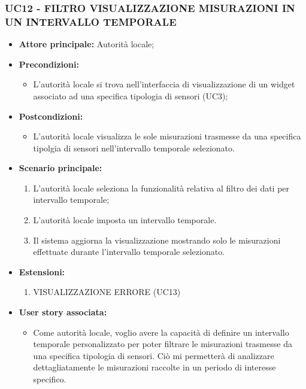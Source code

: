 \subsubsection{UC12 - FILTRO VISUALIZZAZIONE MISURAZIONI IN UN INTERVALLO TEMPORALE}
\begin{itemize}
    \item \textbf{Attore principale:} Autorità locale;
    \item \textbf{Precondizioni:}
        \begin{itemize}
            \item L'autorità locale si trova nell'interfaccia di visualizzazione di un widget associato ad una specifica tipologia di sensori (UC3); 
        \end{itemize}
    \item \textbf{Postcondizioni:}
        \begin{itemize}
            \item L'autorità locale visualizza le sole misurazioni trasmesse da una specifica tipolgia di sensori nell'intervallo temporale selezionato.
        \end{itemize}
    \item \textbf{Scenario principale:}
        \begin{enumerate}
            \item L'autorità locale seleziona la funzionalità relativa al filtro dei dati per intervallo temporale;
            \item L'autorità locale imposta un intervallo temporale.
            \item Il sistema aggiorna la visualizzazione mostrando solo le misurazioni effettuate durante l'intervallo temporale selezionato.
        \end{enumerate}
    \item \textbf{Estensioni:}
    \begin{enumerate}
        \item VISUALIZZAZIONE ERRORE (UC13)
    \end{enumerate}
    \item \textbf{User story associata:} \\
        \begin{itemize}
          \item Come autorità locale, voglio avere la capacità di definire un intervallo temporale personalizzato per poter filtrare le misurazioni trasmesse da una specifica tipologia di sensori. Ciò mi permetterà di analizzare dettagliatamente le misurazioni raccolte in un periodo di interesse specifico.
        \end{itemize}
\end{itemize}